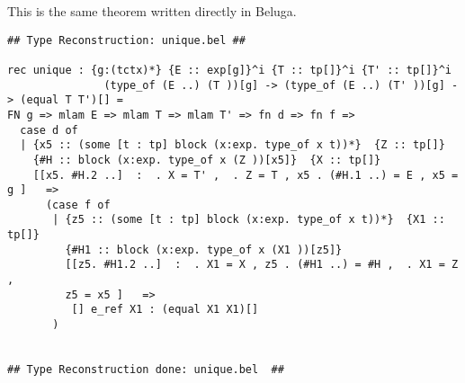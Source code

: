 \documentclass[12pt]{article}
\begin{document}
This is the same theorem written directly in \textmd{Beluga}.
\footnotesize\begin{verbatim}
## Type Reconstruction: unique.bel ##

rec unique : {g:(tctx)*} {E :: exp[g]}^i {T :: tp[]}^i {T' :: tp[]}^i
               (type_of (E ..) (T ))[g] -> (type_of (E ..) (T' ))[g] -> (equal T T')[] = 
FN g => mlam E => mlam T => mlam T' => fn d => fn f => 
  case d of 
  | {x5 :: (some [t : tp] block (x:exp. type_of x t))*}  {Z :: tp[]} 
    {#H :: block (x:exp. type_of x (Z ))[x5]}  {X :: tp[]}
    [[x5. #H.2 ..]  :  . X = T' ,  . Z = T , x5 . (#H.1 ..) = E , x5 = g ]   => 
      (case f of 
       | {z5 :: (some [t : tp] block (x:exp. type_of x t))*}  {X1 :: tp[]} 
         {#H1 :: block (x:exp. type_of x (X1 ))[z5]}
         [[z5. #H1.2 ..]  :  . X1 = X , z5 . (#H1 ..) = #H ,  . X1 = Z ,
         z5 = x5 ]   => 
          [] e_ref X1 : (equal X1 X1)[]
       )
  

## Type Reconstruction done: unique.bel  ##

\end{verbatim}
\end{document}
